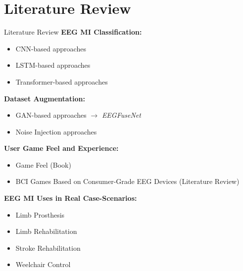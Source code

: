 \section{Literature Review}
\begin{frame}{Literature Review}
\textbf{EEG MI Classification:}
\begin{itemize}
    \item CNN-based approaches
    \item LSTM-based approaches
    \item Transformer-based approaches
\end{itemize}
\textbf{Dataset Augmentation:}
\begin{itemize}
    \item GAN-based approaches $\rightarrow$ \textit{EEGFuseNet}
    \item Noise Injection approaches
\end{itemize}
\textbf{User Game Feel and Experience:}
\begin{itemize}
    \item Game Feel (Book)
    \item BCI Games Based on Consumer-Grade EEG Devices (Literature Review)
\end{itemize}
\textbf{EEG MI Uses in Real Case-Scenarios:}
\begin{itemize}
    \item Limb Prosthesis
    \item Limb Rehabilitation
    \item Stroke Rehabilitation
    \item Weelchair Control
\end{itemize}
\end{frame}